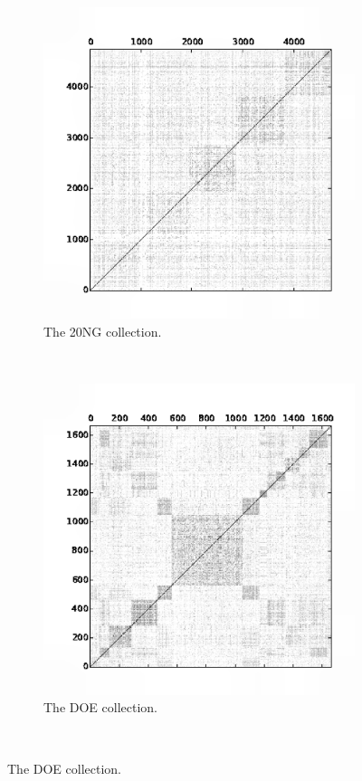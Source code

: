 \documentclass[a4paper]{article}
\begin{document}
\begin{figure}[!htbp]
    \centering
    \begin{subfigure}[b]{0.3\textwidth}
        \includegraphics[width=\textwidth]{./similarities/20NG-simcos}
        \caption{The 20NG collection.}
        \label{fig:20ng_sim}
    \end{subfigure}
    ~ %
    \begin{subfigure}[b]{0.3\textwidth}
        \includegraphics[width=\textwidth]{./similarities/DOE-simcos}
        \caption{The DOE collection.}
        \label{fig:doe_sim}
    \end{subfigure}\\
    

\end{figure}
\end{document}
